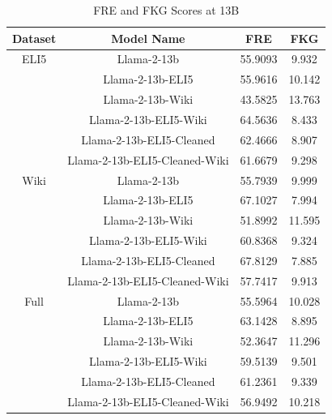 \documentclass[11pt, oneside]{article}   	%
\begin{document}
\begin{table}
\centering
\begin{tabular}{cccc}
\toprule
Dataset & Model Name & FRE & FKG \\
\midrule
ELI5 & Llama-2-13b & 55.9093 & 9.932 \\
 & Llama-2-13b-ELI5 & 55.9616 & 10.142 \\
 & Llama-2-13b-Wiki & 43.5825 & 13.763 \\
  & Llama-2-13b-ELI5-Wiki & 64.5636 & 8.433 \\
 & Llama-2-13b-ELI5-Cleaned & 62.4666 & 8.907 \\
 & Llama-2-13b-ELI5-Cleaned-Wiki & 61.6679 & 9.298 \\
\midrule
Wiki & Llama-2-13b & 55.7939 & 9.999 \\
 & Llama-2-13b-ELI5 & 67.1027 & 7.994 \\
 & Llama-2-13b-Wiki & 51.8992 & 11.595 \\
  & Llama-2-13b-ELI5-Wiki & 60.8368 & 9.324 \\
 & Llama-2-13b-ELI5-Cleaned & 67.8129 & 7.885 \\
 & Llama-2-13b-ELI5-Cleaned-Wiki & 57.7417 & 9.913 \\
 \midrule
Full & Llama-2-13b & 55.5964 & 10.028 \\
 & Llama-2-13b-ELI5 & 63.1428 & 8.895 \\
 & Llama-2-13b-Wiki & 52.3647 & 11.296 \\
  & Llama-2-13b-ELI5-Wiki & 59.5139 & 9.501 \\
 & Llama-2-13b-ELI5-Cleaned & 61.2361 & 9.339 \\
 & Llama-2-13b-ELI5-Cleaned-Wiki & 56.9492 & 10.218 \\
\bottomrule
\end{tabular}
\caption{FRE and FKG Scores at 13B}
\label{tab:FRE_FKG_13B}
\end{table}
\end{document}
